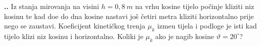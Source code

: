 
\noindent 
\textbf{
\thecjelina.\thezadatak.}
Iz stanja mirovanja na visini $h = 0,8\ m$ na vrhu kosine tijelo po\v{c}inje kliziti niz kosinu te
kad do\dj{}e do dna kosine nastavi još \v{c}etiri metra kliziti horizontalno prije nego se zaustavi.
Koeficijent kineti\v{c}kog trenja $\mu_k$ izme\dj{}u tijela i podloge je isti kad tijelo klizi niz kosinu i
horizontalno. Koliki je $\mu_k$ ako je nagib kosine $\vartheta = 20^\circ$?

